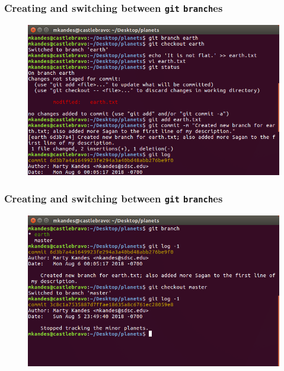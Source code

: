 \documentclass{beamer}
\begin{document}
\begin{frame}
   \frametitle{Creating and switching between \texttt{git} \texttt{branch}es}
   \begin{figure}[htbp]
      \includegraphics[width=1.0\textwidth]{images/git-branch-and-checkout.png}
   \end{figure}
\end{frame}

\begin{frame}
   \frametitle{Creating and switching between \texttt{git} \texttt{branch}es}
   \begin{figure}[htbp]
      \includegraphics[width=1.0\textwidth]{images/git-branch-compare-with-master.png}
   \end{figure}
\end{frame}
\end{document}
